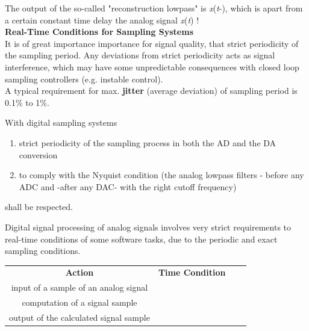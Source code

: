 The output of the so-called "reconstruction lowpass" is \textit{x}(\textit{t}-), which is apart from a certain constant time delay  the analog signal \textit{x}(\textit{t}) !\\

{\rot\bf Real-Time Conditions for Sampling Systems}\\

It is of great importance importance for signal quality, that strict periodicity of the sampling period. Any deviations from strict periodicity acts as signal interference, which may have some unpredictable consequences with closed loop sampling controllers (e.g. instable control).\\

A typical requirement for max. \textbf{jitter} (average deviation) of sampling period is 0.1\% to 1\%.

\begin{tcolorbox}[colback=blue!5!white,colframe=blue!75!black]
With digital sampling systems
\begin{enumerate}
\item strict periodicity of the sampling process in both the AD and the DA conversion
\item to comply with the Nyquist condition (the analog lowpass filters - before any ADC and -after any DAC- with the right cutoff frequency)
\end{enumerate} 	
shall be respected.
\end{tcolorbox}

Digital signal processing of analog signals involves very strict requirements to real-time conditions of some software tasks, due to the periodic and exact sampling conditions.

\begin{table}[h!]
\setlength{\tabcolsep}{10pt} %
\renewcommand{\arraystretch}{1.5} %
\small
\centering
 \begin{tabular}{|c|c|c|c|} \hline
 \textbf{Action} & \textbf{Time Condition} \\ [0.1ex] 
input of a sample of an analog signal &  \\ \hline 
computation of a signal sample &  \\ \hline 
output of the calculated signal sample &  \\ \hline 
 \end{tabular}
 \label{Intrinsic}
\end{table}

